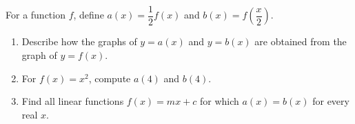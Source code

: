 For a function $f$, define $a(x)=\dfrac12f(x)$ and $b(x)=f\left(\dfrac x2\right)$.
\begin{enumerate}
\item[(a)] Describe how the graphs of $y=a(x)$ and $y=b(x)$ are obtained from the graph of $y=f(x)$.
\item[(b)] For $f(x)=x^2$, compute $a(4)$ and $b(4)$.
\item[(c)] Find all linear functions $f(x)=mx+c$ for which $a(x)=b(x)$ for every real $x$.
\end{enumerate}
